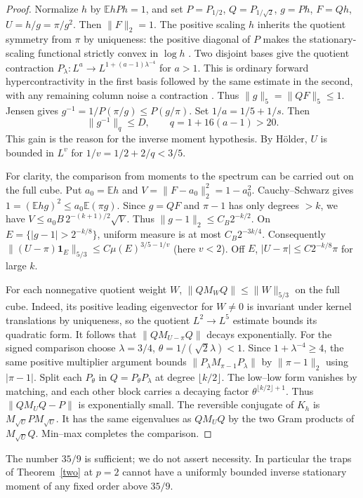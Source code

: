 \documentclass[11pt]{article}
\newcommand{\E}{\mathbb E}
\newcommand{\one}{\mathbf 1}
\begin{document}
\begin{proof}
Normalize $h$ by $\E hP h=1$, and set $P=P_{1/2}$, $Q=P_{1/\sqrt2}$, $g=Ph$, $F=Qh$, $U=h/g=\pi/g^2$. Then $\|F\|_2=1$. The positive scaling $h$ inherits the quotient symmetry from $\pi$ by uniqueness: the positive diagonal of $P$ makes the stationary-scaling functional strictly convex in $\log h$ \cite{shell}. Two disjoint bases give the quotient contraction $P_\lambda:L^a\to L^{1+(a-1)\lambda^{-4}}$ for $a>1$. This is ordinary forward hypercontractivity in the first basis followed by the same estimate in the second, with any remaining column noise a contraction \cite{companion}. Thus $\|g\|_5=\|QF\|_5\le1$. Jensen gives $g^{-1}=1/P(\pi/g)\le P(g/\pi)$. Set $1/a=1/5+1/s$. Then
\[
 \|g^{-1}\|_{q}\le D,\qquad q=1+16(a-1)>20.
\]
This gain is the reason for the inverse moment hypothesis. By H\"older, $U$ is bounded in $L^v$ for $1/v=1/2+2/q<3/5$.

For clarity, the comparison from moments to the spectrum can be carried out on the full cube. Put $a_0=\E h$ and $V=\|F-a_0\|_2^2=1-a_0^2$. Cauchy--Schwarz gives $1=(\E hg)^2\le a_0\E(\pi g)$. Since $g=QF$ and $\pi-1$ has only degrees $>k$, we have $V\le a_0 B\,2^{-(k+1)/2}\sqrt V$. Thus $\|g-1\|_2\le C_B2^{-k/2}$. On $E=\{|g-1|>2^{-k/8}\}$, uniform measure is at most $C_B2^{-3k/4}$. Consequently $\|(U-\pi)\one_E\|_{5/3}\le C\mu(E)^{3/5-1/v}$ (here $v<2$). Off $E$, $|U-\pi|\le C2^{-k/8}\pi$ for large $k$.

For each nonnegative quotient weight $W$, $\|QM_W Q\|\le\|W\|_{5/3}$ on the full cube. Indeed, its positive leading eigenvector for $W\ne0$ is invariant under kernel translations by uniqueness, so the quotient $L^2\to L^5$ estimate bounds its quadratic form. It follows that $\|QM_{U-\pi}Q\|$ decays exponentially. For the signed comparison choose $\lambda=3/4$, $\theta=1/(\sqrt2\lambda)<1$. Since $1+\lambda^{-4}\ge4$, the same positive multiplier argument bounds $\|P_\lambda M_{\pi-1}P_\lambda\|$ by $\|\pi-1\|_2$ using $|\pi-1|$. Split each $P_\theta$ in $Q=P_\theta P_\lambda$ at degree $\lfloor k/2\rfloor$. The low--low form vanishes by matching, and each other block carries a decaying factor $\theta^{\lfloor k/2\rfloor+1}$. Thus $\|QM_UQ-P\|$ is exponentially small. The reversible conjugate of $K_h$ is $M_{\sqrt U}P M_{\sqrt U}$. It has the same eigenvalues as $QM_UQ$ by the two Gram products of $M_{\sqrt U}Q$. Min--max completes the comparison.
\end{proof}
The number $35/9$ is sufficient; we do not assert necessity. In particular the traps of Theorem~\ref{two} at $p=2$ cannot have a uniformly bounded inverse stationary moment of any fixed order above $35/9$.
\end{document}
